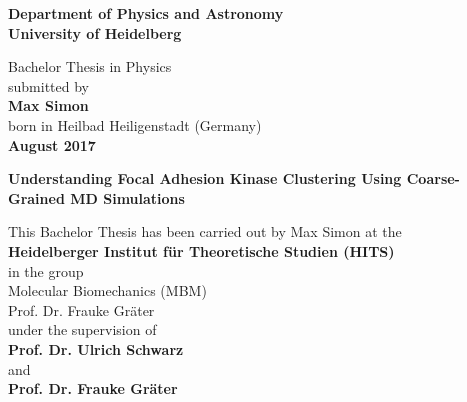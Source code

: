 \begin{titlepage}
\begin{center}
\thispagestyle{empty}
\Large\textbf{Department of Physics and Astronomy\\
University of Heidelberg}

\vspace{15cm}

\normalsize
Bachelor Thesis in Physics\\
submitted by\\
\vspace{0.5cm}
\Large\textbf{Max Simon}\\
\normalsize
\vspace{0.5cm}
born in Heilbad Heiligenstadt (Germany)\\
\vspace{0.5cm}
\Large\textbf{August 2017}
\normalsize

\newpage
\leavevmode\thispagestyle{empty}\newpage

\thispagestyle{empty}

\LARGE\textbf{Understanding Focal Adhesion Kinase Clustering Using Coarse-Grained MD Simulations}

\vspace{15cm}

\normalsize
This Bachelor Thesis has been carried out by Max Simon at the\\
\vspace{0.6cm}
\textbf{Heidelberger Institut für Theoretische Studien (HITS)}\\
in the group\\
Molecular Biomechanics (MBM)\\
Prof. Dr. Frauke Gräter\\
\vspace{0.6cm}
under the supervision of\\
\vspace{0.6cm}
\textbf{Prof. Dr. Ulrich Schwarz}\\
and\\
\textbf{Prof. Dr. Frauke Gräter}
\vfill
\end{center}

\end{titlepage}
